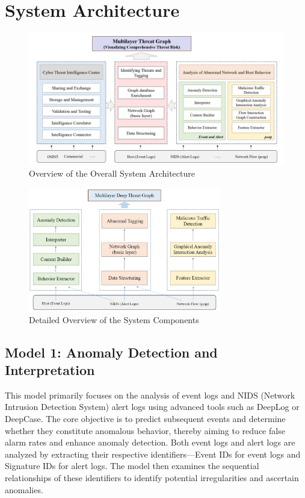\section{System Architecture}

\begin{figure}[!htbp]
    \centering
    \includegraphics[width=1\textwidth]{../images/Overall system architecture.jpg}
    \caption{Overview of the Overall System Architecture}
    \label{fig:overall_system_arch}
\end{figure}

\begin{figure}[!htbp]
    \centering
    \includegraphics[width=0.75\textwidth]{../images/System Architecture.png}
    \caption{Detailed Overview of the System Components}
    \label{fig:detailed_system_arch}
\end{figure}




\subsection{Model 1: Anomaly Detection and Interpretation}
This model primarily focuses on the analysis of event logs and NIDS (Network Intrusion Detection System) alert logs using advanced tools such as DeepLog or DeepCase. The core objective is to predict subsequent events and determine whether they constitute anomalous behavior, thereby aiming to reduce false alarm rates and enhance anomaly detection. Both event logs and alert logs are analyzed by extracting their respective identifiers—Event IDs for event logs and Signature IDs for alert logs. The model then examines the sequential relationships of these identifiers to identify potential irregularities and ascertain anomalies.

